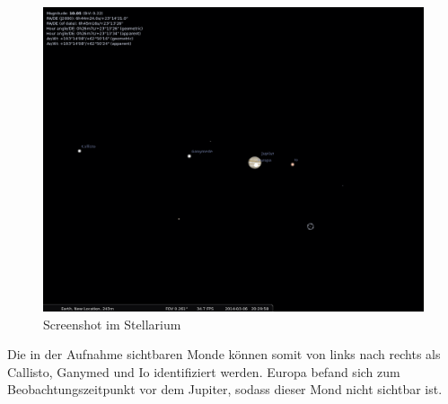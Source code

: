 \begin{figure}[h!]
\centering
        \includegraphics[width=.8\textwidth]{screenshot_jupiter2.png}
\caption{ Screenshot im Stellarium }
\label{fig:scr}
\end{figure}
Die in der Aufnahme sichtbaren Monde können somit von links nach rechts als Callisto, Ganymed und Io identifiziert werden. Europa befand sich zum Beobachtungszeitpunkt vor dem Jupiter, sodass dieser Mond nicht sichtbar ist. 